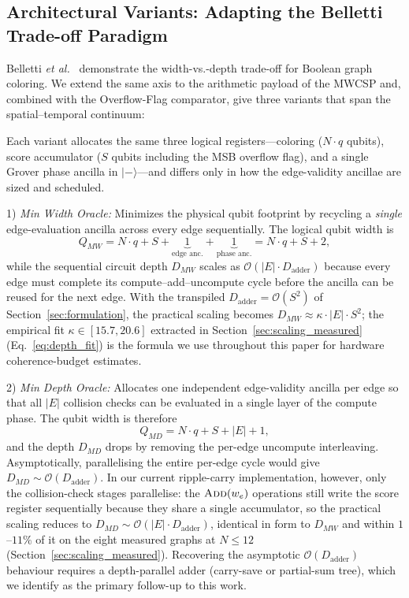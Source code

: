 \documentclass{ieeeaccess}
\begin{document}
\subsection{Architectural Variants: Adapting the Belletti Trade-off Paradigm}
Belletti \textit{et al.}~\cite{belletti2025} demonstrate the width-vs.-depth trade-off for Boolean graph coloring. We extend the same axis to the arithmetic payload of the MWCSP and, combined with the Overflow-Flag comparator, give three variants that span the spatial--temporal continuum:

Each variant allocates the same three logical registers---coloring ($N \cdot q$ qubits), score accumulator ($S$ qubits including the MSB overflow flag), and a single Grover phase ancilla in $|-\rangle$---and differs only in how the edge-validity ancillae are sized and scheduled.

1) \emph{Min Width Oracle:} Minimizes the physical qubit footprint by recycling a \emph{single} edge-evaluation ancilla across every edge sequentially. The logical qubit width is
\begin{equation}
Q_{MW} = N \cdot q + S + \underbrace{1}_{\text{edge anc.}} + \underbrace{1}_{\text{phase anc.}} = N \cdot q + S + 2,
\end{equation}
while the sequential circuit depth $D_{MW}$ scales as $\mathcal{O}(|E| \cdot D_{\text{adder}})$ because every edge must complete its compute--add--uncompute cycle before the ancilla can be reused for the next edge. With the transpiled $D_{\text{adder}} = \mathcal{O}(S^2)$ of Section~\ref{sec:formulation}, the practical scaling becomes $D_{MW} \approx \kappa \cdot |E| \cdot S^2$; the empirical fit $\kappa \in [15.7, 20.6]$ extracted in Section~\ref{sec:scaling_measured} (Eq.~\eqref{eq:depth_fit}) is the formula we use throughout this paper for hardware coherence-budget estimates.

2) \emph{Min Depth Oracle:} Allocates one independent edge-validity ancilla per edge so that all $|E|$ collision checks can be evaluated in a single layer of the compute phase. The qubit width is therefore
\begin{equation}
Q_{MD} = N \cdot q + S + |E| + 1,
\end{equation}
and the depth $D_{MD}$ drops by removing the per-edge uncompute interleaving. Asymptotically, parallelising the entire per-edge cycle would give $D_{MD} \sim \mathcal{O}(D_{\mathrm{adder}})$. In our current ripple-carry implementation, however, only the collision-check stages parallelise: the $\textsc{Add}(w_e)$ operations still write the score register sequentially because they share a single accumulator, so the practical scaling reduces to $D_{MD} \sim \mathcal{O}(|E| \cdot D_{\mathrm{adder}})$, identical in form to $D_{MW}$ and within $1$--$11\%$ of it on the eight measured graphs at $N \le 12$ (Section~\ref{sec:scaling_measured}). Recovering the asymptotic $\mathcal{O}(D_{\mathrm{adder}})$ behaviour requires a depth-parallel adder (carry-save or partial-sum tree), which we identify as the primary follow-up to this work.
\end{document}
